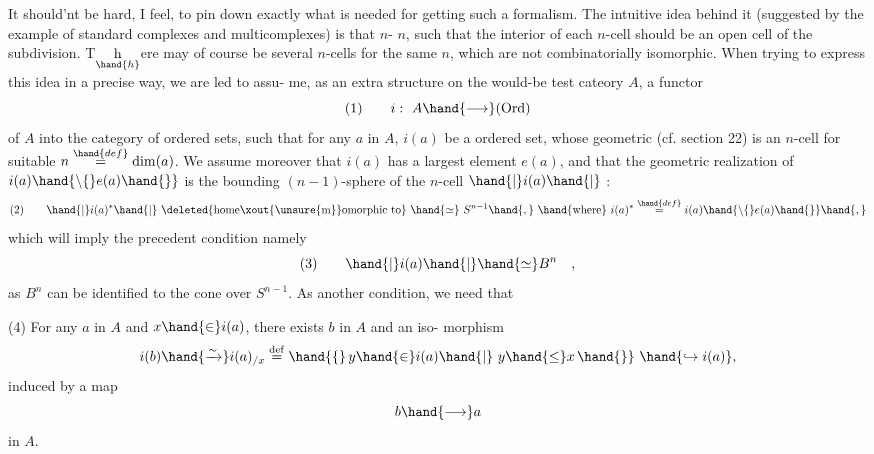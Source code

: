 
It should'nt be hard,  I feel,  to pin down exactly what is needed for
getting such a formalism.  The intuitive idea behind it (suggested by
the example of  standard complexes and multicomplexes)  is that
\hand{\uline{\textcolor{black}{such a formalism should be associated to cellular decompositions of}}}
$n$-\hand{\uline{\textcolor{black}{cells}}} \hand{\uline{\textcolor{black}{for variable}}} $n$,  such that the interior of each $n$-cell should
be an open cell of the subdivision.  T\(\underset{\hand{h}}{\text{h}}\)ere may of course be several
$n$-cells for the same $n$,  which are not combinatorially isomorphic.
When trying to express this idea in a precise way,  we are led to assu-%
me,  as an extra structure on the would-be test cateory $A$,  a functor
\[ (1) \qquad i:\ A \hand{\longrightarrow} (\mathrm{Ord}) \]
of $A$ into the category of ordered sets,  such that for any $a$ in $A$,
$i(a)$ be a \hand{\uline{\textcolor{black}{finite}}} ordered set,  whose geometric   (cf. section
22)  is an $n$-cell for suitable  $n \overset{\hand{def}}{=} \mathrm{dim}(a)$.  We assume moreover that
$i(a)$ has a largest element  $e(a)$,  and that the geometric realization
of  $i(a) \hand{\setminus\{} e(a) \hand{\}}$ is the bounding  $(n-1)$-sphere of the $n$-cell  $\hand{|} i(a) \hand{|}$ :
\[ (2) \qquad \hand{|} i(a)^{*} \hand{|}\ \deleted{\text{home\xout{\unsure{m}}omorphic to}}\ \hand{\simeq}\ S^{n-1} \hand{,}\ \hand{\text{where}}\ i(a)^{*} \overset{\hand{def}}{=} i(a) \hand{\setminus\{}e(a)\hand{\}} \hand{,} \]
which will imply the precedent condition namely
\[ (3) \qquad \hand{|} i(a) \hand{|} \hand{\simeq} B^{n} \quad , \]
as $B^{n}$ can be identified to the cone over $S^{n-1}$.  As another condition,
we need that 

(4) \quad For any $a$ in $A$ and  $x \hand{\in} i(a)$,  there exists $b$ in $A$ and an iso-%
morphism
\[ i(b) \hand{\xrightarrow{\sim}} i(a)_{/x} \overset{\mathrm{def}}{=} \hand{\{}\, y \hand{\in} i(a) \hand{|}\ y \hand{\leq} x \,\hand{\}} \ \hand{\hookrightarrow i(a)}, \]
induced by a map
\[ b \hand{\longrightarrow} a \]
in $A$.


